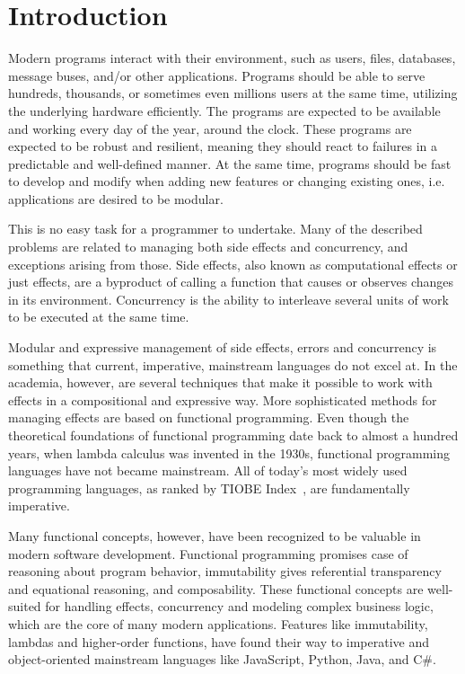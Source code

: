 \chapter{Introduction} \label{Introduction}

Modern programs interact with their environment, such as users, files, databases, message buses, and/or other applications. Programs should be able to serve hundreds, thousands, or sometimes even millions users at the same time, utilizing the underlying hardware efficiently. The programs are expected to be available and working every day of the year, around the clock. These programs are expected to be robust and resilient, meaning they should react to failures in a predictable and well-defined manner. At the same time, programs should be fast to develop and modify when adding new features or changing existing ones, i.e. applications are desired to be modular.

This is no easy task for a programmer to undertake. Many of the described problems are related to managing both side effects and concurrency, and exceptions arising from those. Side effects, also known as computational effects or just effects, are a byproduct of calling a function that causes or observes changes in its environment. Concurrency is the ability to interleave several units of work to be executed at the same time.

Modular and expressive management of side effects, errors and concurrency is something that current, imperative, mainstream languages do not excel at. In the academia, however, are several techniques that make it possible to work with effects in a compositional and expressive way. More sophisticated methods for managing effects are based on functional programming. Even though the theoretical foundations of functional programming date back to almost a hundred years, when lambda calculus was invented in the 1930s, functional programming languages have not became mainstream. All of today's most widely used programming languages, as ranked by TIOBE Index~\cite{tiobe-index}, are fundamentally imperative.

Many functional concepts, however, have been recognized to be valuable in modern software development. Functional programming promises case of reasoning about program behavior, immutability gives referential transparency and equational reasoning, and composability. These functional concepts are well-suited for handling effects, concurrency and modeling complex business logic, which are the core of many modern applications. Features like immutability, lambdas and higher-order functions, have found their way to imperative and object-oriented mainstream languages like JavaScript, Python, Java, and C\#.

